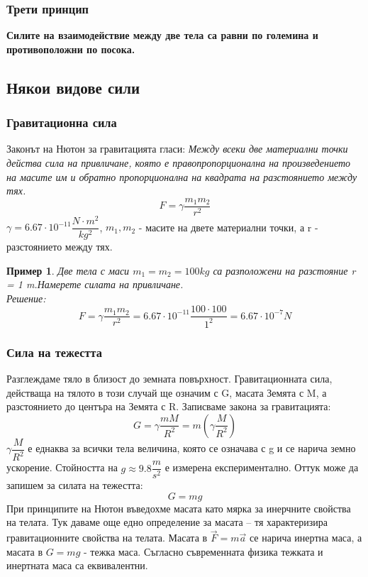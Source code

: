 \documentclass[fleqn, 12pt]{article}
\newtheorem{example}{Пример}[subsection]
\begin{document}
\subsubsection{Трети принцип}
\textbf{Силите на взаимодействие между две тела са равни по големина и противоположни по посока.}

\subsection{Някои видове сили}

\subsubsection{Гравитационна сила}
Законът на Нютон за гравитацията гласи: \textit{Между всеки две материални точки действа сила на привличане, която е правопропорционална на произведението на масите им и обратно пропорционална на квадрата на разстоянието между тях.} \\
$$F = \gamma \dfrac{m_1 m_2}{r^2}$$
$\gamma = 6.67 \cdot 10^{-11} \dfrac{N \cdot m^2}{kg^2}$, $m_1, m_2$ - масите на двете материални точки, а r - разстоянието между тях. 

\begin{example}
Две тела с маси $m_1 =m_2 = 100 kg$ са разположени на разстояние r = 1 m.Намерете силата на привличане. \\
Решение: \\
$$F = \gamma \dfrac{m_1 m_2}{r^2} =  6.67 \cdot 10^{-11}  \dfrac{100 \cdot 100}{1^2} = 6.67 \cdot 10^{-7} N$$
\end{example}


\subsubsection{Сила на тежестта}
Разглеждаме тяло в близост до земната повърхност. Гравитационната сила, действаща на тялото в този случай ще означим с G, масата Земята с M, а разстоянието до центъра на Земята с R. Записваме закона за гравитацията:
$$G = \gamma \dfrac{mM}{R^2} = m \left( \gamma \dfrac{M}{R^2} \right)$$
$\gamma \dfrac{M}{R^2} $ е еднаква за всички тела величина, която се означава с g и се нарича земно ускорение. Стойността на $g \approx 9.8 \dfrac{m}{s^2}$ е измерена експериментално. Оттук може да запишем за силата на тежестта:
$$G = mg$$
При принципите на Нютон въведохме масата като мярка за инерчните свойства на телата. Тук даваме още едно определение за масата – тя характеризира гравитационните свойства на телата. Масата в  $\vec{F} = m \vec{a}$ се нарича инертна маса, а масата в $G = mg$ - тежка маса. Съгласно съвременната физика тежката и инертната маса са еквивалентни.
\end{document}
